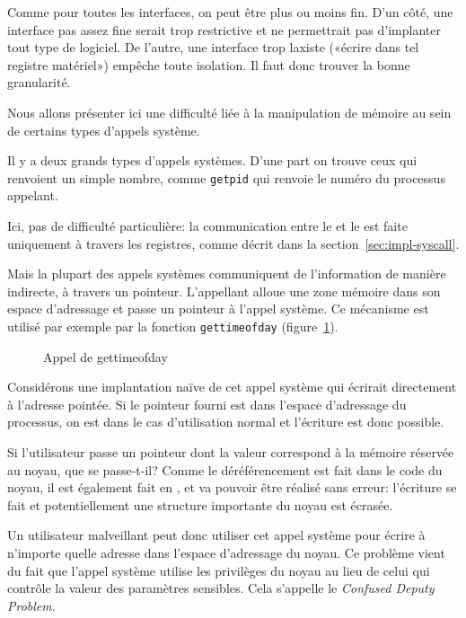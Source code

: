 Comme pour toutes les interfaces, on peut être plus ou moins fin. D'un
côté, une interface pas assez fine serait trop restrictive et ne permettrait pas
d'implanter tout type de logiciel. De l'autre, une interface trop laxiste
(«écrire dans tel registre matériel») empêche toute isolation. Il faut
donc trouver la bonne granularité.

Nous allons présenter ici une difficulté liée à la manipulation de mémoire au
sein de certains types d'appels système.

Il y a deux grands types d'appels systèmes. D'une part on trouve ceux qui
renvoient un simple nombre, comme \texttt{getpid} qui renvoie le numéro du
processus appelant.


Ici, pas de difficulté particulière: la communication entre le  et le
 est faite uniquement à travers les registres, comme décrit dans la
section~\ref{sec:impl-syscall}.

Mais la plupart des appels systèmes communiquent de l'information de manière
indirecte, à travers un pointeur. L'appellant alloue une zone mémoire dans son
espace d'adressage et passe un pointeur à l'appel système. Ce mécanisme est
utilisé par exemple par la fonction \texttt{gettimeofday}
(figure~\ref{fig:appel-gettimeofday}).

\begin{figure}[h]
\caption{Appel de gettimeofday}
\label{fig:appel-gettimeofday}
\end{figure}

Considérons une implantation naïve de cet appel système qui écrirait
directement \linebreak à l'adresse pointée. Si le pointeur fourni est dans l'espace
d'adressage du processus, on est dans le cas d'utilisation normal et l'écriture
est donc possible.

Si l'utilisateur passe un pointeur dont la valeur correspond à la mémoire
réservée au noyau, que se passe-t-il? Comme le déréférencement est fait dans le
code du noyau, il est également fait en , et va pouvoir être réalisé
sans erreur: l'écriture se fait et potentiellement une structure importante du
noyau est écrasée.

Un utilisateur malveillant peut donc utiliser cet appel système pour écrire à
n'importe quelle adresse dans l'espace d'adressage du noyau. Ce problème vient
du fait que l'appel système utilise les privilèges du noyau au lieu de celui qui
contrôle la valeur des paramètres sensibles. Cela s'appelle le \emph{Confused
Deputy Problem}\cite{hardy88confused}.

